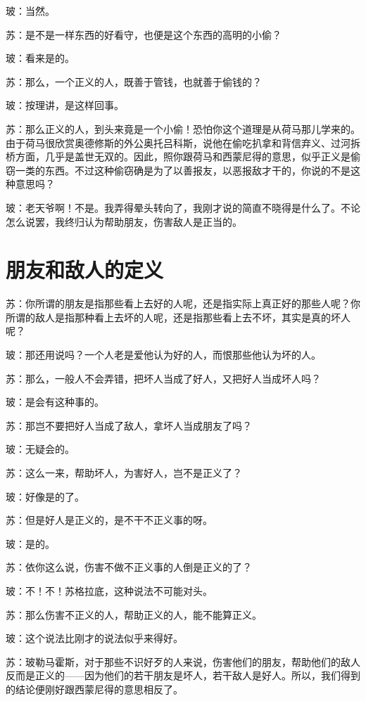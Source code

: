 \documentclass[11pt,oneside]{book}
\begin{document}
\begin{common-format}
玻：当然。

苏：是不是一样东西的好看守，也便是这个东西的高明的小偷？

玻：看来是的。

苏：那么，一个正义的人，既善于管钱，也就善于偷钱的？

玻：按理讲，是这样回事。

苏：那么正义的人，到头来竟是一个小偷！恐怕你这个道理是从荷马那儿学来的。由于荷马很欣赏奥德修斯的外公奥托吕科斯，说他在偷吃扒拿和背信弃义、过河拆桥方面，几乎是盖世无双的。因此，照你跟荷马和西蒙尼得的意思，似乎正义是偷窃一类的东西。不过这种偷窃确是为了以善报友，以恶报敌才干的，你说的不是这种意思吗？


玻：老天爷啊！不是。我弄得晕头转向了，我刚才说的简直不晓得是什么了。不论怎么说罢，我终归认为帮助朋友，伤害敌人是正当的。


\section{朋友和敌人的定义}
苏：你所谓的朋友是指那些看上去好的人呢，还是指实际上真正好的那些人呢？你所谓的敌人是指那种看上去坏的人呢，还是指那些看上去不坏，其实是真的坏人呢？

玻：那还用说吗？一个人老是爱他认为好的人，而恨那些他认为坏的人。

苏：那么，一般人不会弄错，把坏人当成了好人，又把好人当成坏人吗？

玻：是会有这种事的。

苏：那岂不要把好人当成了敌人，拿坏人当成朋友了吗？

玻：无疑会的。

苏：这么一来，帮助坏人，为害好人，岂不是正义了？

玻：好像是的了。

苏：但是好人是正义的，是不干不正义事的呀。

玻：是的。

苏：依你这么说，伤害不做不正义事的人倒是正义的了？

玻：不！不！苏格拉底，这种说法不可能对头。

苏：那么伤害不正义的人，帮助正义的人，能不能算正义。

玻：这个说法比刚才的说法似乎来得好。

苏：玻勒马霍斯，对于那些不识好歹的人来说，伤害他们的朋友，帮助他们的敌人反而是正义的——因为他们的若干朋友是坏人，若干敌人是好人。所以，我们得到的结论便刚好跟西蒙尼得的意思相反了。


\end{common-format}
\end{document}

